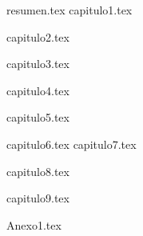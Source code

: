 \documentclass[12pt,tesis,twoside,openright,spanish]{upiiztt}
\begin{document}
                   
\cleardoublepage\pagestyle{empty}
{resumen.tex}   
\clearpage{}
\pagestyle{plain}
{capitulo1.tex}          
          
{capitulo2.tex} 
               
{capitulo3.tex} 
                   
{capitulo4.tex} 
                
{capitulo5.tex} 

{capitulo6.tex} 
%
{capitulo7.tex}  

{capitulo8.tex} 

{capitulo9.tex} 

\begin{firmasTT}

\end{firmasTT}


{Anexo1.tex} 

\end{document}
